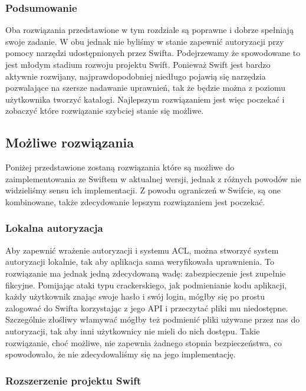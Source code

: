 	\subsubsection{Podsumowanie}\label{sub:podsumowanie}
	
	Oba rozwiązania przedstawione w tym rozdziale są poprawne i dobrze spełniają swoje zadanie. W obu jednak nie byliśmy w stanie zapewnić autoryzacji przy pomocy narzędzi udostępnionych przez Swifta. Podejrzewamy że spowodowane to jest młodym stadium rozwoju projektu Swift. Ponieważ Swift jest bardzo aktywnie rozwijany, najprawdopodobniej niedługo pojawią się narzędzia pozwalające na szersze nadawanie uprawnień, tak że będzie można z poziomu użytkownika tworzyć katalogi. Najlepszym rozwiązaniem jest więc poczekać i zobaczyć które rozwiązanie szybciej stanie się możliwe.
	
	\subsection{Możliwe rozwiązania}\label{sec:mozliwe rozwiazania}

	Poniżej przedstawione zostaną rozwiązania które są możliwe do zaimplementowania ze Swiftem w aktualnej wersji, jednak z różnych powodów nie widzieliśmy sensu ich implementacji. Z powodu ograniczeń w Swifcie, są one kombinowane, także zdecydowanie lepszym rozwiązaniem jest poczekać.

	\subsubsection{Lokalna autoryzacja}\label{sub:lokalna autoryzacja}

	Aby zapewnić wrażenie autoryzacji i systemu ACL, można stworzyć system autoryzacji lokalnie, tak aby aplikacja sama weryfikowała uprawnienia. To rozwiązanie ma jednak jedną zdecydowaną wadę: zabezpieczenie jest zupełnie fikcyjne. Pomijając ataki typu crackerskiego, jak podmienianie kodu aplikacji, każdy użytkownik znając swoje hasło i swój login, mógłby się po prostu zalogować do Swifta korzystając z jego API i przeczytać pliki mu niedostępne. Szczególnie złośliwy włamywać mógłby też podmienić pliki używane przez nas do autoryzacji, tak aby inni użytkownicy nie mieli do nich dostępu. Takie rozwiązanie, choć możliwe, nie zapewnia żadnego stopnia bezpieczeństwa, co spowodowało, że nie zdecydowaliśmy się na jego implementację.

	\subsubsection{Rozszerzenie projektu Swift}\label{sub:rozszerzenie projektu swift}

